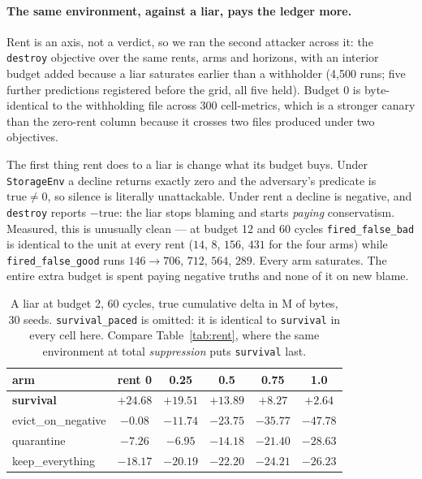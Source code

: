\paragraph{The same environment, against a liar, pays the ledger more.}
Rent is an axis, not a verdict, so we ran the second attacker across it:
the \texttt{destroy} objective over the same rents, arms and horizons,
with an interior budget added because a liar saturates earlier than a
withholder (4,500 runs; five further predictions registered before the
grid, all five held). Budget 0 is byte-identical to the withholding file
across 300 cell-metrics, which is a stronger canary than the zero-rent
column because it crosses two files produced under two objectives.

The first thing rent does to a liar is change what its budget buys.
Under \texttt{StorageEnv} a decline returns exactly zero and the
adversary's predicate is $\text{true} \neq 0$, so silence is literally
unattackable. Under rent a decline is negative, and \texttt{destroy}
reports $-\text{true}$: the liar stops blaming and starts \emph{paying}
conservatism. Measured, this is unusually clean --- at budget 12 and 60
cycles \texttt{fired\_false\_bad} is identical to the unit at every rent
($14$, $8$, $156$, $431$ for the four arms) while
\texttt{fired\_false\_good} runs $146 \rightarrow 706$, $712$, $564$,
$289$. Every arm saturates. The entire extra budget is spent paying
negative truths and none of it on new blame.

\begin{table}[t]
\centering
\tabsize
\caption{A liar at budget 2, 60 cycles, true cumulative delta in M of
bytes, 30 seeds. \texttt{survival\_paced} is omitted: it is identical to
\texttt{survival} in every cell here. Compare Table~\ref{tab:rent},
where the same environment at total \emph{suppression} puts
\texttt{survival} last.}
\label{tab:rent-lying}
\begin{tabular}{lccccc}
\toprule
arm & rent 0 & 0.25 & 0.5 & 0.75 & 1.0 \\
\midrule
\textbf{survival} & $\mathbf{+24.68}$ & $\mathbf{+19.51}$ & $\mathbf{+13.89}$ & $\mathbf{+8.27}$ & $\mathbf{+2.64}$ \\
evict\_on\_negative & $-0.08$ & $-11.74$ & $-23.75$ & $-35.77$ & $-47.78$ \\
quarantine & $-7.26$ & $-6.95$ & $-14.18$ & $-21.40$ & $-28.63$ \\
keep\_everything & $-18.17$ & $-20.19$ & $-22.20$ & $-24.21$ & $-26.23$ \\
\bottomrule
\end{tabular}
\end{table}

